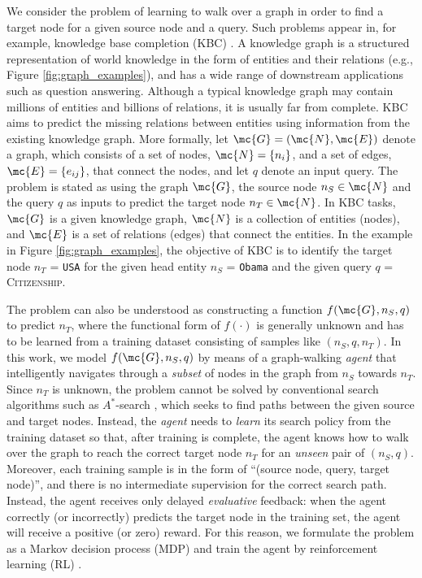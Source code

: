 \documentclass{article}
\begin{document}
	We consider the problem of learning to walk over a graph in order to find a target node for a given source node and a query. Such problems appear in, for example, knowledge base completion (KBC) \cite{DeepPath,lin2015learning,trouillon2017knowledge,NickelTrKr11,gaosurvey}. A knowledge graph is a structured representation of world knowledge in the form of entities and their relations (e.g., Figure \ref{fig:graph_examples}), and has a wide range of downstream applications such as question answering. Although a typical knowledge graph may contain millions of entities and billions of relations, it is usually far from complete. KBC aims to predict the missing relations between entities using information from the existing knowledge graph.
	More formally, let $\mc{G} = (\mc{N},\mc{E})$ denote a graph, which consists of a set of nodes, $\mc{N}=\{n_{i}\}$, and a set of edges, $\mc{E}=\{e_{ij}\}$, that connect the nodes, and let $q$ denote an input query. The problem is stated as using the graph $\mc{G}$, the source node $n_S \in \mc{N}$ and the query $q$ as inputs to predict the target node $n_T \in \mc{N}$. In KBC tasks, $\mc{G}$ is a given knowledge graph, $\mc{N}$ is a collection of entities (nodes), and $\mc{E}$ is a set of relations (edges) that connect the entities. In the example in Figure \ref{fig:graph_examples}, the objective of KBC is to identify the target node $n_T$ = \texttt{USA} for the given head entity $n_S$ = \texttt{Obama} and the given query $q$ = \textsc{Citizenship}.
	
	
	The problem can also be understood as constructing a function $f(\mc{G}, n_S, q)$ to predict $n_T$, where the functional form of $f(\cdot)$ is generally unknown and has to be learned from a training dataset consisting of samples like $(n_S, q, n_T)$. In this work, we model $f(\mc{G}, n_S, q)$ by means of a graph-walking \emph{agent} that intelligently navigates through a \emph{subset} of nodes in the graph from $n_S$ towards $n_T$. Since $n_T$ is unknown, the problem cannot be solved by conventional search algorithms such as $A^*$-search \cite{hart1968formal}, which seeks to find paths between the given source and target nodes. Instead, the \emph{agent} needs to \emph{learn} its search policy from the training dataset so that, after training is complete, the agent knows how to walk over the graph to reach the correct target node $n_T$ for an \emph{unseen} pair of $(n_S, q)$. Moreover, each training sample is in the form of ``(source node, query, target node)'', and there is no intermediate supervision for the correct search path. Instead, the agent receives only delayed \emph{evaluative} feedback: when the agent correctly (or incorrectly) predicts the target node in the training set, the agent will receive a positive (or zero) reward. For this reason, we formulate the problem as a Markov decision process (MDP) and train the agent by reinforcement learning (RL) \cite{sutton1998reinforcement}. 
	
\end{document}

